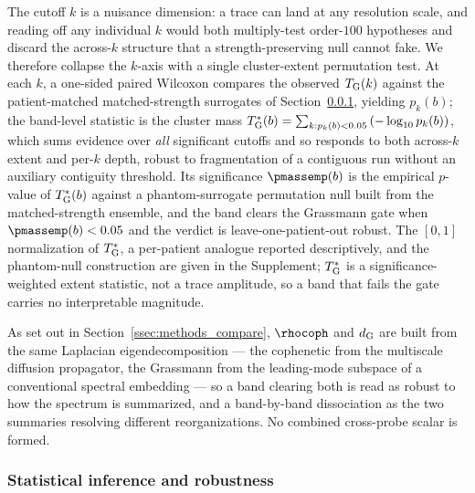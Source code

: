 The cutoff \(k\) is a nuisance dimension: a trace can land at any resolution scale, and reading off any individual \(k\) would both multiply-test order-\(100\) hypotheses and discard the across-\(k\) structure that a strength-preserving null cannot fake. We therefore collapse the \(k\)-axis with a single cluster-extent permutation test. At each \(k\), a one-sided paired Wilcoxon compares the observed \(T_{\rm G}(k)\) against the patient-matched matched-strength surrogates of Section~\ref{sssec:methods_compare_stats}, yielding \(p_{k}(b)\); the band-level statistic is the cluster mass \(T_{\rm G}^{\ast}(b) = \sum_{k : p_{k}(b) < 0.05}\left(-\log_{10} p_{k}(b)\right)\), which sums evidence over \emph{all} significant cutoffs and so responds to both across-\(k\) extent and per-\(k\) depth, robust to fragmentation of a contiguous run without an auxiliary contiguity threshold. Its significance \(\pmassemp(b)\) is the empirical \(p\)-value of \(T_{\rm G}^{\ast}(b)\) against a phantom-surrogate permutation null built from the matched-strength ensemble, and the band clears the Grassmann gate when \(\pmassemp(b) < 0.05\) and the verdict is leave-one-patient-out robust. The \([0,1]\) normalization of \(T_{\rm G}^{\ast}\), a per-patient analogue reported descriptively, and the phantom-null construction are given in the Supplement; \(T_{\rm G}^{\ast}\) is a significance-weighted extent statistic, not a trace amplitude, so a band that fails the gate carries no interpretable magnitude.

As set out in Section~\ref{ssec:methods_compare}, \(\rhocoph\) and \(d_{\rm G}\) are built from the same Laplacian eigendecomposition --- the cophenetic from the multiscale diffusion propagator, the Grassmann from the leading-mode subspace of a conventional spectral embedding --- so a band clearing both is read as robust to how the spectrum is summarized, and a band-by-band dissociation as the two summaries resolving different reorganizations. No combined cross-probe scalar is formed.
%
\subsubsection{Statistical inference and robustness}
    \label{sssec:methods_compare_stats}
%
